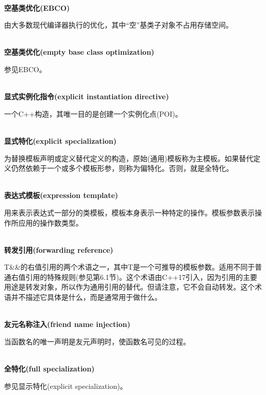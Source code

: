 \hspace*{\fill} \\ %
\noindent
\textbf{空基类优化(EBCO)}

由大多数现代编译器执行的优化，其中“空”基类子对象不占用存储空间。

\hspace*{\fill} \\ %
\noindent
\textbf{空基类优化(empty base class optimization)}

参见EBCO。

\hspace*{\fill} \\ %
\noindent
\textbf{显式实例化指令(explicit instantiation directive)}

一个C++构造，其唯一目的是创建一个实例化点(POI)。

\hspace*{\fill} \\ %
\noindent
\textbf{显式特化(explicit specialization)}

为替换模板声明或定义替代定义的构造，原始(通用)模板称为主模板。如果替代定义仍然依赖于一个或多个模板形参，则称为偏特化。否则，就是全特化。

\hspace*{\fill} \\ %
\noindent
\textbf{表达式模板(expression template)}

用来表示表达式一部分的类模板，模板本身表示一种特定的操作。模板参数表示操作所应用的操作数类型。

\hspace*{\fill} \\ %
\noindent
\textbf{转发引用(forwarding reference)}

T\&\&的右值引用的两个术语之一，其中T是一个可推导的模板参数。适用不同于普通右值引用的特殊规则(参见第6.1节)。这个术语由C++17引入，因为引用的主要用途是转发对象，所以作为通用引用的替代。但请注意，它不会自动转发。这个术语并不描述它具体是什么，而是通常用于做什么。

\hspace*{\fill} \\ %
\noindent
\textbf{友元名称注入(friend name injection)}

当函数名的唯一声明是友元声明时，使函数名可见的过程。

\hspace*{\fill} \\ %
\noindent
\textbf{全特化(full specialization)}

参见显示特化(explicit specialization)。

